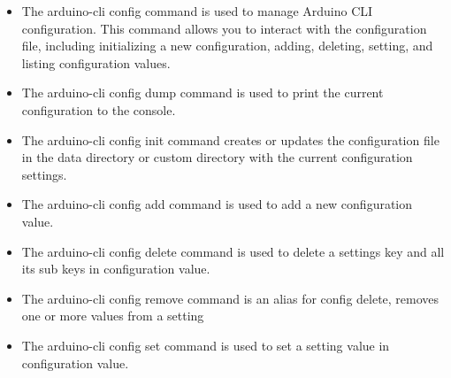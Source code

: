 \begin{itemize}
    
    \item {}
    
    The arduino-cli config command is used to manage Arduino CLI configuration. This command allows you to interact with the configuration file, including initializing a new configuration, adding, deleting, setting, and listing configuration values.
    
    
    \item {}
    
    The arduino-cli config dump command is used to print the current configuration to the console.
    
    
    \item {}
    
    The arduino-cli config init command creates or updates the configuration file in the data directory or custom directory with the current configuration settings.
    
    
    \item {}
    
    The arduino-cli config add command is used to add a new configuration value.
    
    
    \item {}
    
    The arduino-cli config delete command is used to delete a settings key and all its sub keys in configuration value.
    
    
    \item {}
    
    The arduino-cli config remove command is an alias for config delete, removes one or more values from a setting
    
    
    \item {}
    
    The arduino-cli config set command is used to set a setting value in configuration value.
    

\end{itemize}
